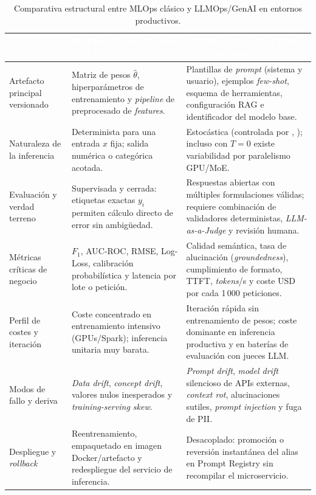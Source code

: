 \begin{table}[htbp]
\centering
\caption{Comparativa estructural entre MLOps clásico y LLMOps/GenAI en entornos productivos.}
\label{tab:mlops-vs-llmops}
\small
\begin{tabularx}{\textwidth}{@{}L{2.7cm} Y Y@{}}
\toprule
{}
\textcolor{white}{\sffamily\bfseries Dimensión} &
\textcolor{white}{\sffamily\bfseries MLOps Clásico (Tabular / DL)} &
\textcolor{white}{\sffamily\bfseries LLMOps / GenAI (LLMs, RAG, Agentes)} \\
\midrule
Artefacto principal versionado &
Matriz de pesos $\hat{\theta}$, hiperparámetros de entrenamiento y \textit{pipeline} de preprocesado de \textit{features}. &
Plantillas de \textit{prompt} (sistema y usuario), ejemplos \textit{few-shot}, esquema de herramientas, configuración RAG e identificador del modelo base. \\
Naturaleza de la inferencia &
Determinista para una entrada $x$ fija; salida numérica o categórica acotada. &
Estocástica (controlada por , ); incluso con $T=0$ existe variabilidad por paralelismo GPU/MoE. \\
Evaluación y verdad terreno &
Supervisada y cerrada: etiquetas exactas $y_i$ permiten cálculo directo de error sin ambigüedad. &
Respuestas abiertas con múltiples formulaciones válidas; requiere combinación de validadores deterministas, \textit{LLM-as-a-Judge} y revisión humana. \\
Métricas críticas de negocio &
$F_1$, AUC-ROC, RMSE, Log-Loss, calibración probabilística y latencia por lote o petición. &
Calidad semántica, tasa de alucinación (\textit{groundedness}), cumplimiento de formato, TTFT, \textit{tokens}/s y coste USD por cada 1\,000 peticiones. \\
Perfil de costes y iteración &
Coste concentrado en entrenamiento intensivo (GPUs/Spark); inferencia unitaria muy barata. &
Iteración rápida sin entrenamiento de pesos; coste dominante en inferencia productiva y en baterías de evaluación con jueces LLM. \\
Modos de fallo y deriva &
\textit{Data drift}, \textit{concept drift}, valores nulos inesperados y \textit{training-serving skew}. &
\textit{Prompt drift}, \textit{model drift} silencioso de APIs externas, \textit{context rot}, alucinaciones sutiles, \textit{prompt injection} y fuga de PII. \\
Despliegue y \textit{rollback} &
Reentrenamiento, empaquetado en imagen Docker/artefacto y redespliegue del servicio de inferencia. &
Desacoplado: promoción o reversión instantánea del alias  en Prompt Registry sin recompilar el microservicio. \\
\bottomrule
\end{tabularx}
\end{table}

